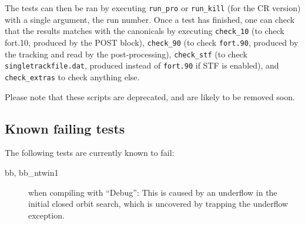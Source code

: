 \documentclass[english]{article}
\begin{document}
The tests can then be ran by executing \texttt{run\_pro} or \texttt{run\_kill} (for the CR version) with a single argument, the run number.
Once a test has finished, one can check that the results matches with the canonicals by executing \texttt{check\_10} (to check fort.10, produced by the POST block), \texttt{check\_90} (to check \texttt{fort.90}, produced by the tracking and read by the post-processing), \texttt{check\_stf} (to check \texttt{singletrackfile.dat}, produced instead of \texttt{fort.90} if STF is enabled), and \texttt{check\_extras} to check anything else.

Please note that these scripts are deprecated, and are likely to be removed soon.

\subsection{Known failing tests}
The following tests are currently known to fail:
\begin{description}
\item[bb, bb\_ntwin1] when compiling with ``Debug'': This is caused by an underflow in the initial closed orbit search, which is uncovered by trapping the underflow exception.
\end{description}
\end{document}
